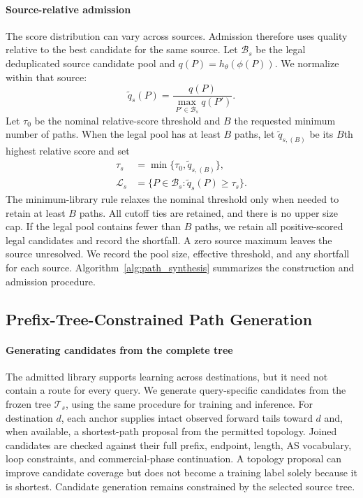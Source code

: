 \paragraph{Source-relative admission}
The score distribution can vary across sources. Admission therefore uses
quality relative to the best candidate for the same source. Let
$\mathcal B_s$ be the legal deduplicated source candidate pool and
$q(P)=h_\theta(\phi(P))$. We normalize within that source:
\begin{equation}
\widetilde q_s(P)=\frac{q(P)}{\max_{P'\in\mathcal B_s}q(P')}.
\label{eq:relative_quality}
\end{equation}
Let $\tau_0$ be the nominal relative-score threshold and $B$ the
requested minimum number of paths. When the legal pool has at least $B$
paths, let $\widetilde q_{s,(B)}$ be its $B$th highest relative score and set
\begin{equation}
\begin{split}
\tau_s&=\min\{\tau_0,\widetilde q_{s,(B)}\},\\
\mathcal L_s&=\{P\in\mathcal B_s:\widetilde q_s(P)\geq\tau_s\}.
\end{split}
\label{eq:quality_admission}
\end{equation}
The minimum-library rule relaxes the nominal threshold only when needed
to retain at least $B$ paths. All cutoff ties are retained, and there is
no upper size cap. If the legal pool contains fewer than $B$ paths, we
retain all positive-scored legal candidates and record the shortfall.
A zero source maximum leaves the source unresolved. We record the pool
size, effective threshold, and any shortfall for each source.
Algorithm~\ref{alg:path_synthesis} summarizes the construction and
admission procedure.



\subsection{Prefix-Tree-Constrained Path Generation}
\label{sec:inference}

\paragraph{Generating candidates from the complete tree}
The admitted library supports learning across destinations, but it need
not contain a route for every query. We generate query-specific
candidates from the frozen tree $\mathcal T_s$, using the same procedure
for training and inference. For destination $d$, each anchor supplies
intact observed forward tails toward $d$ and, when available, a
shortest-path proposal from the permitted topology. Joined candidates
are checked against their full prefix, endpoint, length, AS vocabulary,
loop constraints, and commercial-phase continuation. A topology proposal
can improve candidate coverage but does not become a training label
solely because it is shortest. Candidate generation remains constrained
by the selected source tree.

